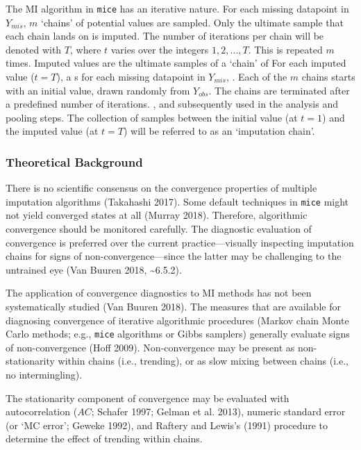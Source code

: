 \documentclass[
  Royal, times, sageapa]{sagej}
\begin{document}
The MI algorithm in \texttt{mice} has an iterative nature. For each
missing datapoint in \(Y_{mis}\), \(m\) `chains' of potential values are
sampled. Only the ultimate sample that each chain lands on is imputed.
The number of iterations per chain will be denoted with \(T\), where
\(t\) varies over the integers \(1, 2, \dots, T\). This is repeated
\(m\) times. Imputed values are the ultimate samples of a `chain' of For
each imputed value (\(t = T\)), a s for each missing datapoint in
\(Y_{mis}\), . Each of the \(m\) chains starts with an initial value,
drawn randomly from \(Y_{obs}\). The chains are terminated after a
predefined number of iterations. , and subsequently used in the analysis
and pooling steps. The collection of samples between the initial value
(at \(t=1\)) and the imputed value (at \(t=T\)) will be referred to as
an `imputation chain'.

\hypertarget{theoretical-background}{%
\subsubsection{Theoretical Background}\label{theoretical-background}}

There is no scientific consensus on the convergence properties of
multiple imputation algorithms (Takahashi 2017). Some default techniques
in \texttt{mice} might not yield converged states at all (Murray 2018).
Therefore, algorithmic convergence should be monitored carefully. The
diagnostic evaluation of convergence is preferred over the current
practice---visually inspecting imputation chains for signs of
non-convergence---since the latter may be challenging to the untrained
eye (Van Buuren 2018, \textasciitilde6.5.2).

The application of convergence diagnostics to MI methods has not been
systematically studied (Van Buuren 2018). The measures that are
available for diagnosing convergence of iterative algorithmic procedures
(Markov chain Monte Carlo methods; e.g., \texttt{mice} algorithms or
Gibbs samplers) generally evaluate signs of non-convergence (Hoff 2009).
Non-convergence may be present as non-stationarity within chains (i.e.,
trending), or as slow mixing between chains (i.e., no intermingling).

The stationarity component of convergence may be evaluated with
autocorrelation (\(AC\); Schafer 1997; Gelman et al. 2013), numeric
standard error (or `MC error'; Geweke 1992), and Raftery and Lewis's
(1991) procedure to determine the effect of trending within chains.
\end{document}
